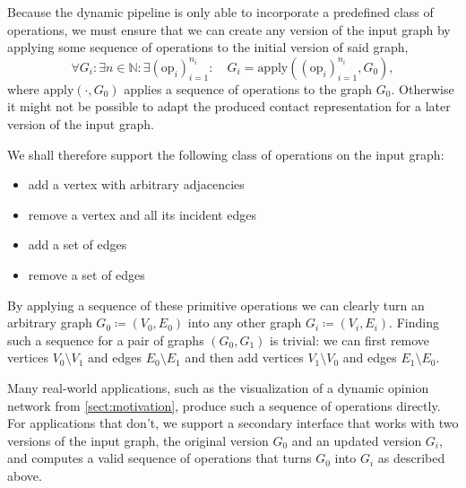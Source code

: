 Because the dynamic pipeline is only able to incorporate a predefined class of operations, we must ensure that we can create any version of the input graph by applying some sequence of operations to the initial version of said graph, \ie{}
%
\begin{equation*}
	\forall G_i \colon \exists n \in \mathbb{N} \colon \exists (\text{op}_i)_{i=1}^{n_i} \colon \quad G_i = \text{apply}((\text{op}_i)_{i=1}^{n_i}, G_0),
\end{equation*}
%
where $\text{apply}(\cdot, G_0)$ applies a sequence of operations to the graph $G_0$. Otherwise it might not be possible to adapt the produced contact representation for a later version of the input graph.

We shall therefore support the following class of operations on the input graph:
%
\begin{itemize}
	\setlength\itemsep{-0.5em}
	\item add a vertex with arbitrary adjacencies
	\item remove a vertex and all its incident edges
	\item add a set of edges
	\item remove a set of edges
\end{itemize}
%
By applying a sequence of these primitive operations we can clearly turn an arbitrary graph $G_0 \coloneqq (V_0, E_0)$ into any other graph $G_i \coloneqq (V_i, E_i)$. Finding such a sequence for a pair of graphs $(G_0, G_1)$ is trivial: we can first remove vertices $V_0 \setminus V_1$ and edges $E_0 \setminus E_1$ and then add vertices $V_1 \setminus V_0$ and edges $E_1 \setminus E_0$.

Many real-world applications, such as the visualization of a dynamic opinion network from \cref{sect:motivation}, produce such a sequence of operations directly. For applications that don't, we support a secondary interface that works with two versions of the input graph, the original version $G_0$ and an updated version $G_i$, and computes a valid sequence of operations that turns $G_0$ into $G_i$ as described above.

\clearpage

\clearpage

\clearpage


